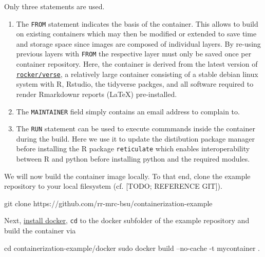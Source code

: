 \documentclass[]{book}
\newenvironment{Shaded}{\begin{snugshade}}{\end{snugshade}}
\newcommand{\FunctionTok}[1]{\textcolor[rgb]{0.00,0.00,0.00}{#1}}
\newcommand{\BuiltInTok}[1]{#1}
\newcommand{\NormalTok}[1]{#1}
\providecommand{\tightlist}{%
  \setlength{\itemsep}{0pt}\setlength{\parskip}{0pt}}
\begin{document}
Only three statements are used.

\begin{enumerate}
\def\labelenumi{\arabic{enumi}.}
\tightlist
\item
  The \texttt{FROM} statement indicates the basis of the container. This
  allows to build on existing containers which may then be modified or
  extended to save time and storage space since images are composed of
  individual layers. By re-using previous layers with \texttt{FROM} the
  respective layer must only be saved once per container repository.
  Here, the container is derived from the latest version of
  \href{https://www.rocker-project.org/}{\texttt{rocker/verse}}, a
  relatively large container consisting of a stable debian linux system
  with R, Rstudio, the tidyverse packges, and all software required to
  render Rmarkdownr reports (LaTeX) pre-installed.
\item
  The \texttt{MAINTAINER} field simply contains an email address to
  complain to.
\item
  The \texttt{RUN} statement can be used to execute commmands inside the
  container during the build. Here we use it to update the distibution
  package manager before installing the R package \texttt{reticulate}
  which enables interoperability between R and python before installing
  python and the required modules.
\end{enumerate}

We will now build the container image locally. To that end, clone the
example repository to your local filesystem (cf. {[}TODO; REFERENCE
GIT{]}).

\begin{Shaded}
\begin{Highlighting}[]
\FunctionTok{git}\NormalTok{ clone https://github.com/rr-mrc-bsu/containerization-example}
\end{Highlighting}
\end{Shaded}

Next, \href{https://docs.docker.com/install/}{install docker},
\texttt{cd} to the docker subfolder of the example repository and build
the container via

\begin{Shaded}
\begin{Highlighting}[]
\BuiltInTok{cd}\NormalTok{ containerization-example/docker}
\FunctionTok{sudo}\NormalTok{ docker build --no-cache -t mycontainer .}
\end{Highlighting}
\end{Shaded}
\end{document}
